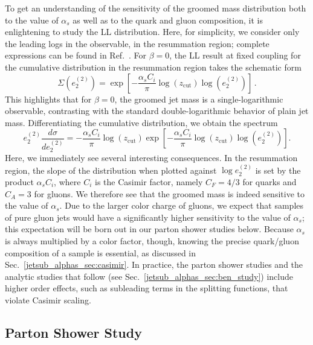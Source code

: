 \documentclass[11pt]{cernrep}
\begin{document}
To get an understanding of the sensitivity of the groomed mass distribution both to the value of $\alpha_s$ as well as to the quark and gluon composition, it is enlightening to study the LL distribution.
%
Here, for simplicity, we consider only the leading logs in the observable, in the resummation region; complete expressions can be found in Ref.~\cite{Larkoski:2014wba,Frye:2016aiz,Marzani:2017kqd,Marzani:2017mva}.
%
For $\beta=0$, the LL result at fixed coupling for the cumulative distribution in the resummation region takes the schematic form
%
\begin{equation}
\Sigma(e_2^{(2)})=\exp\left[ - \frac{\alpha_s C_i}{\pi} \log(z_{\mathrm{cut}} ) \log (e_2^{(2)}) \right]\,.
\end{equation}
%
This highlights that for $\beta=0$, the groomed jet mass is a single-logarithmic observable, contrasting with the standard double-logarithmic behavior of plain jet mass.
%
Differentiating the cumulative distribution, we obtain the spectrum
%
\begin{equation}
\label{jetsub_alphas_eq:ecf_ll_dsitribution}
e_2^{(2)} \frac{d\sigma}{d e_2^{(2)}}=   - \frac{\alpha_s C_i}{\pi} \log(z_{\mathrm{cut}} )   \exp\left[ - \frac{\alpha_s C_i}{\pi}  \log(z_{\mathrm{cut}} ) \log (e_2^{(2)}) \right].
\end{equation}
%
Here, we immediately see several interesting consequences.
%
In the resummation region, the slope of the distribution when plotted against $\log e_2^{(2)}$ is set by the product $\alpha_s C_i$, where $C_i$ is the Casimir factor, namely $C_F = 4/3$ for quarks and $C_A = 3$ for gluons.
%
We therefore see that the groomed mass is indeed sensitive to the value of $\alpha_s$.
%
Due to the larger color charge of gluons, we expect that samples of pure gluon jets would have a significantly higher sensitivity to the value of $\alpha_s$; this expectation will be born out in our parton shower studies below.
%
Because $\alpha_s$ is always multiplied by a color factor, though, knowing the precise quark/gluon composition of a sample is essential, as discussed in Sec.~\ref{jetsub_alphas_sec:casimir}.
%
In practice, the parton shower studies and the analytic studies that follow (see Sec.~\ref{jetsub_alphas_sec:ben_study}) include higher order effects, such as subleading terms in the splitting functions, that violate Casimir scaling.

\subsection{Parton Shower Study}
\end{document}
